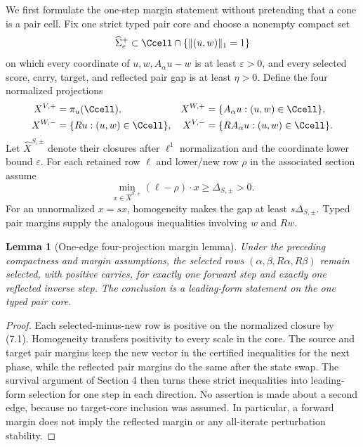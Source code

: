 \documentclass[11pt]{article}
\newtheorem{lemma}[theorem]{Lemma}
\theoremstyle{definition}
\theoremstyle{remark}
\begin{document}
We first formulate the one-step margin statement without pretending that a
cone is a pair cell.  Fix one strict typed pair core and choose a nonempty
compact set
\[
 \widehat\Sigma_e^+\subset
 \Ccell\cap\{\|(u,w)\|_1=1\}
\]
on which every coordinate of $u,w,A_\alpha u-w$ is at least
$\varepsilon>0$, and every selected score, carry, target, and reflected
pair gap is at least $\eta>0$.  Define the four normalized projections
\[
 \begin{aligned}
 X^{V,+}&=\pi_u(\Ccell),&
 X^{W,+}&=\{A_\alpha u:(u,w)\in\Ccell\},\\
 X^{W,-}&=\{Ru:(u,w)\in\Ccell\},&
 X^{V,-}&=\{RA_\alpha u:(u,w)\in\Ccell\}.
 \end{aligned}
\]
Let $\widehat X^{S,\pm}$ denote their closures after $\ell^1$ normalization
and the coordinate lower bound $\varepsilon$.  For each retained row
$\ell$ and lower/new row $\rho$ in the associated section assume
\[
 \min_{x\in\widehat X^{S,\pm}}
 (\ell-\rho)\cdot x\geq\Delta_{S,\pm}>0.
\tag{7.1}
\]
For an unnormalized $x=s\widehat x$, homogeneity makes the gap at least
$s\Delta_{S,\pm}$.  Typed pair margins supply the analogous inequalities
involving $w$ and $Rw$.

\begin{lemma}[One-edge four-projection margin lemma]
\label{lem:margin}
Under the preceding compactness and margin assumptions, the selected rows
$(\alpha,\beta,R\alpha,R\beta)$ remain selected, with positive carries, for
exactly one forward step and exactly one reflected inverse step.  The
conclusion is a leading-form statement on the one typed pair core.
\end{lemma}

\begin{proof}
Each selected-minus-new row is positive on the normalized closure by (7.1).
Homogeneity transfers positivity to every scale in the core.  The source
and target pair margins keep the new vector in the certified inequalities
for the next phase, while the reflected pair margins do the same after the
state swap.  The survival argument of Section 4 then turns these strict
inequalities into leading-form selection for one step in each direction.
No assertion is made about a second edge, because no target-core inclusion
was assumed.  In particular, a forward margin does not imply the reflected
margin or any all-iterate perturbation stability.
\end{proof}
\end{document}
